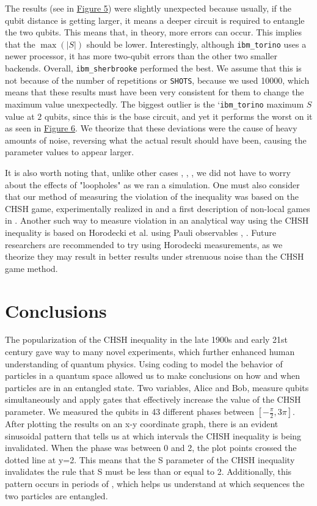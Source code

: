 \documentclass[a4paper, onecolumn, 11pt, titlepage]{quantumarticle}
\begin{document}
The results (see in \hyperref[fig:all]{Figure 5}) were slightly unexpected because usually, if the qubit distance is getting larger, it means a deeper circuit is required to entangle the two qubits. This means that, in theory, more errors can occur. This implies that the $\max(|S|)$ should be lower. Interestingly, although \verb|ibm_torino| uses a newer processor, it has more two-qubit errors than the other two smaller backends. Overall, \verb|ibm_sherbrooke| performed the best. We assume that this is not because of the number of repetitions or \verb|SHOTS|, because we used 10000, which means that these results must have been very consistent for them to change the maximum value unexpectedly. The biggest outlier is the `\verb|ibm_torino| maximum $S$ value at $2$ qubits, since this is the base circuit, and yet it performs the worst on it as seen in \hyperref[fig:torino]{Figure 6}. We theorize that these deviations were the cause of heavy amounts of noise, reversing what the actual result should have been, causing the parameter values to appear larger. 

It is also worth noting that, unlike other cases \cite{storz2023loophole}, \cite{steinacker2025bell}, \cite{Zhong_2019}, we did not have to worry about the effects of "loopholes" as we ran a simulation. One must also consider that our method of measuring the violation of the inequality was based on the CHSH game, experimentally realized in \cite{PhysRevLett.49.91} and a first description of non-local games in \cite{cleve2010consequenceslimitsnonlocalstrategies}. Another such way to measure violation in an analytical way using the CHSH inequality is based on Horodecki et al. \cite{HORODECKI1995340, HORODECKI1996223} using Pauli observables \cite{PhysRevA.88.052105}, \cite{Kalaga_2024}. Future researchers are recommended to try using Horodecki measurements, as we theorize they may result in better results under strenuous noise than the CHSH game method.

\section{Conclusions}

The popularization of the CHSH inequality in the late 1900s and early 21st century gave way to many novel experiments, which further enhanced human understanding of quantum physics. Using coding to model the behavior of particles in a quantum space allowed us to make conclusions on how and when particles are in an entangled state. Two variables, Alice and Bob, measure qubits simultaneously and apply gates that effectively increase the value of the CHSH parameter. We measured the qubits in 43 different phases between $[-\frac\pi2, 3\pi]$. After plotting the results on an x-y coordinate graph, there is an evident sinusoidal pattern that tells us at which intervals the CHSH inequality is being invalidated. When the phase was between 0 and 2, the plot points crossed the dotted line at y=2. This means that the S parameter of the CHSH inequality invalidates the rule that S must be less than or equal to 2. Additionally, this pattern occurs in periods of , which helps us understand at which sequences the two particles are entangled. 
\end{document}
